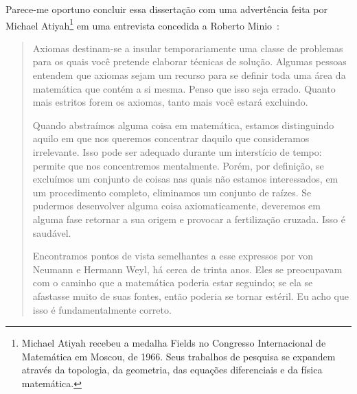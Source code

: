 \documentclass{hipatia}
\begin{document}
Parece-me oportuno concluir essa dissertação com uma advertência feita por Michael Atiyah\footnote{Michael Atiyah recebeu a medalha Fields no Congresso Internacional de Matemática em Moscou, de 1966. Seus trabalhos de pesquisa se expandem através da topologia, da geometria, das equações diferenciais e da física matemática.
} em uma entrevista concedida a Roberto Minio~\cite[p. 11]{minio1984}:  
\begin{quote}
Axiomas destinam-se a insular temporariamente uma classe de problemas para os quais você pretende elaborar técnicas de solução. Algumas pessoas entendem que axiomas sejam um recurso para se definir toda uma área da matemática que contém a si mesma. Penso que isso seja errado. Quanto mais estritos forem os axiomas, tanto mais você estará excluindo.

Quando abstraímos alguma coisa em matemática, estamos distinguindo aquilo em que nos queremos concentrar daquilo que consideramos irrelevante. Isso pode ser adequado durante um interstício de tempo: permite que nos concentremos mentalmente. Porém, por definição, se excluímos um conjunto de coisas nas quais não estamos interessados, em um procedimento completo, eliminamos um conjunto de raízes. Se pudermos desenvolver alguma coisa axiomaticamente, deveremos em alguma fase retornar a sua origem e provocar a fertilização cruzada. Isso é saudável.

Encontramos pontos de vista semelhantes a esse expressos por von Neumann e Hermann Weyl, há cerca de trinta anos. Eles se preocupavam com o caminho que a matemática poderia
estar seguindo; se ela se afastasse muito de suas fontes, então
poderia se tornar estéril. Eu acho que isso é fundamentalmente correto.
\end{quote}






\nocite{*}




\end{document}
